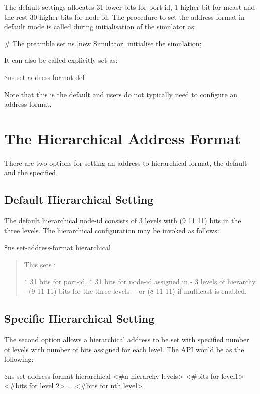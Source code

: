 The default settings allocates 31 lower bits for port-id, 1 higher bit
for mcast and the rest 30 higher bits for node-id. The procedure to set
the address format in default mode is called during initialisation of
the simulator as:

\begin{program}
{\cf # The preamble}
set ns [new Simulator]                  \; initialise the simulation;
\end{program}

It can also be called explicitly set as:
\begin{program}
\$ns set-address-format def
\end{program}

Note that this is the default and users do not typically need to configure
an address format.

\section{The Hierarchical Address Format}
\label{sec:hierFormat}

There are two options for setting an address to hierarchical format, the
default and the specified.

\subsection{Default Hierarchical Setting}
\label{sec:def-hier}
The default hierarchical node-id consists of 3 levels with (9 11 11) bits
in the three levels. The hierarchical configuration may be invoked as
follows: 

\$ns set-address-format hierarchical

\begin{quote}
This sets :

* 31 bits for port-id, 
* 31 bits for node-id assigned in 
  - 3 levels of hierarchy 
  - (9 11 11) bits for the three levels. 
  - or (8 11 11) if multicast is enabled. 
\end{quote}

\subsection{Specific Hierarchical Setting}
\label{sec:sp-hier}
The second option allows a hierarchical address to be set with specified
number of levels with number of bits assigned for each level. The API
would be as the following:

\$ns set-address-format hierarchical <\#n hierarchy levels> <\#bits for
level1> <\#bits for level 2> ....<\#bits for nth level> 


